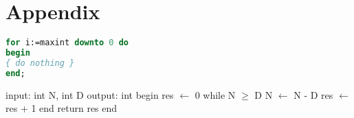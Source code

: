 \chapter{Appendix}

\begin{lstlisting}[float=b,language=Pascal,frame=tb,caption={A floating example (\texttt{listings} manual)},label=lst:useless]
for i:=maxint downto 0 do
begin
{ do nothing }
end;
\end{lstlisting}

\begin{algorithm}[caption={Integer division.}, label={alg1}]
 input: int N, int D
 output: int
 begin
   res $\gets$ 0
   while N $\geq$ D 
     N $\gets$ N - D
     res $\gets$ res + 1      
   end
   return res
 end       
\end{algorithm}